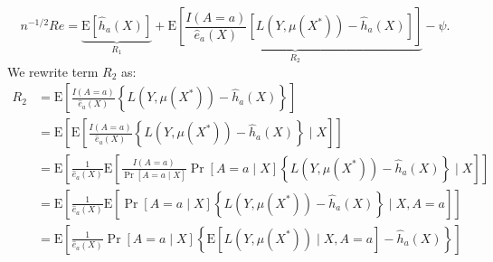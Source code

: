 $$
n^{-1 / 2} Re=
\underbrace{\mathrm{E}\left[\widehat{h}_a(X)\right]}_{R_1}+\underbrace{\mathrm{E}\left[\frac{I(A = a)}{\widehat{e}_a(X)}\left[L\left(Y, \mu\left(X^*\right)\right)-\widehat{h}_a(X)\right]\right]}_{R_2}-\psi.
$$
We rewrite term $R_2$ as:
$$
\begin{aligned}
R_2 & =\mathrm{E}\left[\frac{ I(A=a)}{\widehat{e}_a(X)}\left\{L\left(Y, \mu\left(X^*\right)\right)-\widehat{h}_a(X)\right\}\right] \\
& =\mathrm{E}\left[\mathrm{E}\left[\frac{ I(A=a)}{\widehat{e}_a(X)}\left\{L\left(Y, \mu\left(X^*\right)\right)-\widehat{h}_a(X)\right\} \mid X\right]\right] \\
& =\mathrm{E}\left[\frac{1}{\widehat{e}_a(X)} \mathrm{E}\left[\frac{I(A=a)}{\operatorname{Pr}[A=a \mid X]} \operatorname{Pr}[A=a \mid X]\left\{L\left(Y, \mu\left(X^*\right)\right)-\widehat{h}_a(X)\right\} \mid X\right]\right] \\
& =\mathrm{E}\left[\frac{1}{\widehat{e}_a(X)} \mathrm{E}\left[\operatorname{Pr}[A=a \mid X]\left\{L\left(Y, \mu\left(X^*\right)\right)-\widehat{h}_a(X)\right\} \mid X, A=a\right]\right] \\
& =\mathrm{E}\left[\frac{1}{\widehat{e}_a(X)} \operatorname{Pr}[A=a \mid X]\left\{\mathrm{E}\left[L\left(Y, \mu\left(X^*\right)\right) \mid X, A=a\right]-\widehat{h}_a(X)\right\}\right]
\end{aligned}
$$
